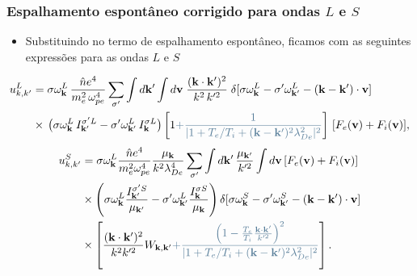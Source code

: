 \documentclass[10pt,aspectratio=1610,lualatex]{beamer}
\begin{document}
\begin{frame}
  \frametitle{Espalhamento espontâneo corrigido para ondas $L$ e $S$}
  \begin{itemize}
    \item Substituindo no termo de espalhamento espontâneo, ficamos com as
    seguintes expressões para as ondas $L$ e $S$
  \end{itemize}
  \vspace{0.2cm}
  \begin{equation*}
    \begin{split}
      u_{k,k'}^{L}&=\sigma\omega_{\bf k}^L\,
      \frac{\hat n e^4}{m_e^2\,\omega_{pe}^4}
      \sum_{\sigma '}\int d{\bf k'}\int d{\bf v}\;
      \frac{({\bf k}\cdot{\bf k}')^2}{k^2\,k'^2}\;
      \delta[\sigma\omega_{\bf k}^L-\sigma '\omega_{{\bf k}'}^L
      -({\bf k}-{\bf k}')\cdot{\bf v}]\\
      &\times\,\bigl(\sigma\omega_{\bf k}^L\,I_{{\bf k}'}^{\sigma 'L}
      -\sigma '\omega_{{\bf k}'}^L\, I_{\bf k}^{\sigma L}\bigr)
      \left[1\textcolor{darkblue}{
	  + \frac{1}{|1+T_e/T_i+({\bf k-k'})^2 \lambda_{De}^2|^2}}
      \right] \,[F_e({\bf v})+F_i({\bf v})],
    \end{split}
  \end{equation*}
  \vspace{0.3cm}
  \begin{equation*}
    \begin{split}
      u_{k,k'}^{S}&=\sigma\omega_{\bf k}^L
      \frac{\hat n e^4}{m_e^2\omega_{pe}^4}
      \frac{\mu_{\bf k}}{k^2\lambda_{De}^4}\sum_{\sigma '}
      \int d{\bf k'}\,\frac{\mu_{{\bf k}'}}{k'^2}
      \int d{\bf v}\,[F_e({\bf v})+F_i({\bf v})]\\
      &\times\left(\sigma\omega_{\bf k}^L
	\frac{I_{{\bf k}'}^{\sigma 'S}}{\mu_{{\bf k}'}}
	-\sigma '\omega_{{\bf k}'}^L
	\frac{I_{\bf k}^{\sigma S}}{\mu_{\bf k}}\right)
      \delta[\sigma\omega_{\bf k}^S-\sigma '\omega_{{\bf k}'}^S
      -({\bf k}-{\bf k}')\cdot{\bf v}]\\
      &\times\left[\frac{({\bf k}\cdot{\bf  k}')^2}{k^2k'^2}
	W_{{\bf k},{\bf k}'}\textcolor{darkblue}{
	  +\frac{\left(1-\frac{T_e}{T_i}
	      \frac{\bf k \cdot k'}{k'^2}\right)^2}
	  {|1+T_e/T_i+({\bf k-k'})^2 \lambda_{De}^2|^2}}\right].
    \end{split}
  \end{equation*}
\end{frame}
\end{document}
